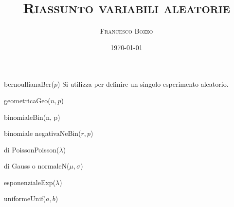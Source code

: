 \documentclass[
	,a4paper
	,12pt
	,oneside
]{article}
\title{\textsc{Riassunto variabili aleatorie}}
\author{\textsc{Francesco Bozzo}}
\date{\today}
\begin{document}
\maketitle

\begin{aleatoria}{bernoulliana}{Ber(\(p\))}
	Si utilizza per definire un singolo esperimento aleatorio.
\end{aleatoria}

\begin{aleatoria}{geometrica}{Geo(\(n, p\))}
\end{aleatoria}

\begin{aleatoria}{binomiale}{Bin(n, p)}
\end{aleatoria}

\begin{aleatoria}{binomiale negativa}{NeBin(\(r, p\))}
\end{aleatoria}

\begin{aleatoria}{di Poisson}{Poisson(\(\lambda\))}
\end{aleatoria}

\begin{aleatoria}{di Gauss o normale}{N(\(\mu, \sigma\))}
\end{aleatoria}

\begin{aleatoria}{esponenziale}{Exp(\(\lambda\))}
\end{aleatoria}

\begin{aleatoria}{uniforme}{Unif(\(a, b\))}
	\densita{
		\begin{cases}
			\frac{1}{b-a} & \text{per } x \in (a, b] \\
			0 & \text{altrimenti}
		\end{cases}
	}
\end{aleatoria}
\end{document}
